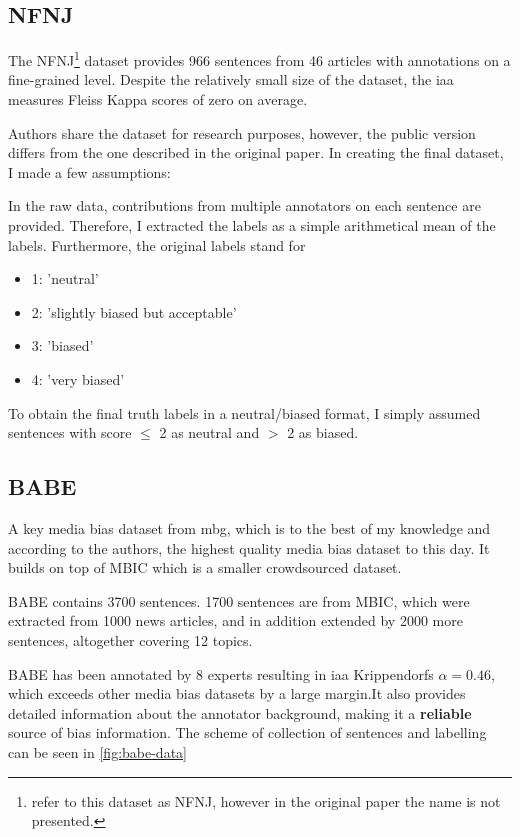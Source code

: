 \subsection{NFNJ}
The NFNJ\footnote{\cite{farber2020multidimensional} refer to this dataset as NFNJ, however in the original paper the name is not presented.} dataset provides 966 sentences from 46 articles with annotations on a fine-grained level. Despite the relatively small size of the dataset, the \Gls{iaa} measures Fleiss Kappa scores of zero on average.

Authors share the dataset for research purposes, however, the public version differs from the one described in the original paper. In creating the final dataset, I made a few assumptions:

In the raw data, contributions from multiple annotators on each sentence are provided. Therefore, I extracted the labels as a simple arithmetical mean of the labels. Furthermore, the original labels stand for 
\begin{itemize}
    \item 1: 'neutral'
    \item 2: 'slightly biased but acceptable'
    \item 3: 'biased'
    \item 4: 'very biased'
\end{itemize}
To obtain the final truth labels in a neutral/biased format, I simply assumed sentences with score $\leq$ 2 as neutral and $>$ 2 as biased.




\subsection{BABE}
A key media bias dataset from \Gls{mbg}, which is to the best of my knowledge and according to the authors, the highest quality media bias dataset to this day. It builds on top of MBIC \cite{Spinde2021MBIC} which is a smaller crowdsourced dataset.

BABE contains 3700 sentences. 1700 sentences are from MBIC, which were extracted from 1000 news articles, and in addition extended by 2000 more sentences, altogether covering 12 topics.

BABE has been annotated by 8 experts resulting in \gls{iaa} Krippendorfs $\alpha = 0.46$, which exceeds other media bias datasets by a large margin.It also provides detailed information about the annotator background, making it a \textbf{reliable} source of bias information. The scheme of collection of sentences and labelling can be seen in \ref{fig:babe-data}

